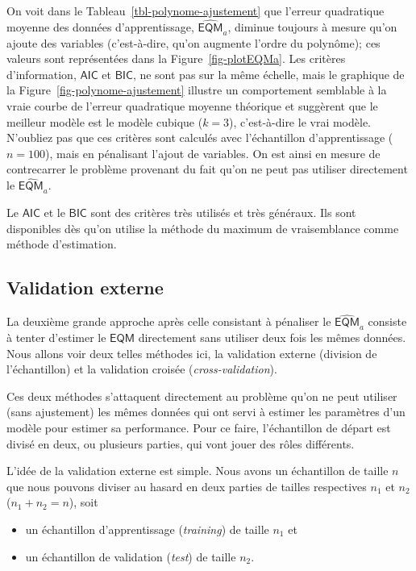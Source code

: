 \documentclass[
  11pt,
  letterpaper,
]{book}
\providecommand{\tightlist}{%
  \setlength{\itemsep}{0pt}\setlength{\parskip}{0pt}}\usepackage{longtable,booktabs,array}
\theoremstyle{definition}
\theoremstyle{remark}
\begin{document}
On voit dans le Tableau~\ref{tbl-polynome-ajustement} que l'erreur
quadratique moyenne des données d'apprentissage,
\(\widehat{\mathsf{EQM}}_a\), diminue toujours à mesure qu'on ajoute des
variables (c'est-à-dire, qu'on augmente l'ordre du polynôme); ces
valeurs sont représentées dans la Figure~\ref{fig-plotEQMa}. Les
critères d'information, \(\mathsf{AIC}\) et \(\mathsf{BIC}\), ne sont
pas sur la même échelle, mais le graphique de la
Figure~\ref{fig-polynome-ajustement} illustre un comportement semblable
à la vraie courbe de l'erreur quadratique moyenne théorique et suggèrent
que le meilleur modèle est le modèle cubique (\(k=3\)), c'est-à-dire le
vrai modèle. N'oubliez pas que ces critères sont calculés avec
l'échantillon d'apprentissage (\(n=100\)), mais en pénalisant l'ajout de
variables. On est ainsi en mesure de contrecarrer le problème provenant
du fait qu'on ne peut pas utiliser directement le
\(\widehat{\mathsf{EQM}}_a\).

Le \(\mathsf{AIC}\) et le \(\mathsf{BIC}\) sont des critères très
utilisés et très généraux. Ils sont disponibles dès qu'on utilise la
méthode du maximum de vraisemblance comme méthode d'estimation.

\hypertarget{validation-externe}{%
\subsection{Validation externe}\label{validation-externe}}

La deuxième grande approche après celle consistant à pénaliser le
\(\widehat{\mathsf{EQM}}_a\) consiste à tenter d'estimer le
\(\mathsf{EQM}\) directement sans utiliser deux fois les mêmes données.
Nous allons voir deux telles méthodes ici, la validation externe
(division de l'échantillon) et la validation croisée
(\emph{cross-validation}).

Ces deux méthodes s'attaquent directement au problème qu'on ne peut
utiliser (sans ajustement) les mêmes données qui ont servi à estimer les
paramètres d'un modèle pour estimer sa performance. Pour ce faire,
l'échantillon de départ est divisé en deux, ou plusieurs parties, qui
vont jouer des rôles différents.

L'idée de la validation externe est simple. Nous avons un échantillon de
taille \(n\) que nous pouvons diviser au hasard en deux parties de
tailles respectives \(n_1\) et \(n_2\) (\(n_1+n_2=n\)), soit

\begin{itemize}
\tightlist
\item
  un échantillon d'apprentissage (\emph{training}) de taille \(n_1\) et
\item
  un échantillon de validation (\emph{test}) de taille \(n_2\).
\end{itemize}
\end{document}
